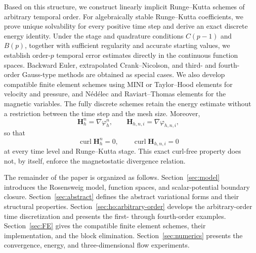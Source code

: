 \documentclass[11pt,a4paper]{article}
\newcommand{\bs}{\boldsymbol}
\DeclareMathOperator{\curl}{curl}
\theoremstyle{definition}
\numberwithin{equation}{section}
\begin{document}
Based on this structure, we construct linearly implicit Runge--Kutta
schemes of arbitrary temporal order. For algebraically stable
Runge--Kutta coefficients, we prove unique solvability for every
positive time step and derive an exact discrete energy identity.
Under the stage and quadrature conditions \(C(p-1)\) and \(B(p)\),
together with sufficient regularity and accurate starting values, we
establish order-\(p\) temporal error estimates directly in the
continuous function spaces. Backward Euler, extrapolated
Crank--Nicolson, and third- and fourth-order Gauss-type methods are
obtained as special cases. We also develop compatible finite element
schemes using MINI or Taylor--Hood elements for velocity and pressure,
and N\'ed\'elec and Raviart--Thomas elements for the magnetic
variables. The fully discrete schemes retain the energy estimate
without a restriction between the time step and the mesh size.
Moreover,
\[
 \bs H_h^n=\nabla\varphi_h^n,
 \qquad
 \bs H_{h,n,i}=\nabla\varphi_{h,n,i},
\]
so that
\[
 \curl\bs H_h^n=0,
 \qquad
 \curl\bs H_{h,n,i}=0
\]
at every time level and Runge--Kutta stage. This exact curl-free
property does not, by itself, enforce the magnetostatic divergence
relation.



The remainder of the paper is organized as follows.
Section~\ref{sec:model} introduces the Rosensweig model, function
spaces, and scalar-potential boundary closure.
Section~\ref{sec:abstract} defines the abstract variational forms and
their structural properties.
Section~\ref{sec:ho:arbitrary-order} develops the arbitrary-order
time discretization and presents the first- through fourth-order
examples.
Section~\ref{sec:FE} gives the compatible finite element schemes,
their implementation, and the block elimination.
Section~\ref{sec:numerics} presents the convergence, energy, and
three-dimensional flow experiments.
\end{document}

